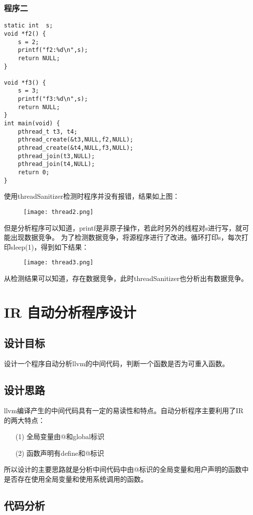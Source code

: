\documentclass[UTF8]{ctexart}
\begin{document}
\subsubsection{程序二}
\begin{lstlisting}[frame=shadowbox, rulesepcolor=\color{red!20!green!20!blue!20}] 
static int  s;
void *f2() {
    s = 2;
    printf("f2:%d\n",s);
    return NULL;
}

void *f3() {
    s = 3;
    printf("f3:%d\n",s);
    return NULL;
}
int main(void) {
    pthread_t t3, t4;
    pthread_create(&t3,NULL,f2,NULL);
    pthread_create(&t4,NULL,f3,NULL);
    pthread_join(t3,NULL);
    pthread_join(t4,NULL);
    return 0;
}
\end{lstlisting}
\newpage
使用threadSanitizer检测时程序并没有报错，结果如上图：
\begin{figure}
    \centering
    \texttt{[image: thread2.png]}
\end{figure}
但是分析程序可以知道，printf是非原子操作，若此时另外的线程对s进行写，就可能出现数据竞争。
为了检测数据竞争，将源程序进行了改进。循环打印s，每次打印sleep(1)，得到如下结果：
\begin{figure}[h]
    \centering
    \texttt{[image: thread3.png]}
\end{figure}
从检测结果可以知道，存在数据竞争，此时threadSanitizer也分析出有数据竞争。
\section{IR 自动分析程序设计}
\subsection{设计目标}
设计一个程序自动分析llvm的中间代码，判断一个函数是否为可重入函数。
\subsection{设计思路}
llvm编译产生的中间代码具有一定的易读性和特点。自动分析程序主要利用了IR的两大特点：
\begin{itemize}
    \item [(1)] 全局变量由@和global标识
    \item [(2)] 函数声明有define和@标识 
\end{itemize}
所以设计的主要思路就是分析中间代码中由@标识的全局变量和用户声明的函数中是否存在使用全局变量和使用系统调用的函数。
\subsection{代码分析}
\end{document}
